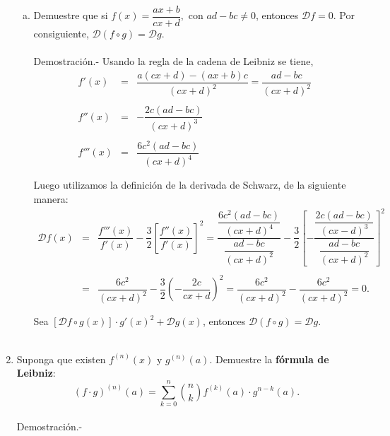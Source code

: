 \begin{enumerate}[\bfseries 1.]
\begin{enumerate}[(a)]
	     \item Demuestre que si $f(x)=\dfrac{ax+b}{cx+d},$ con $ad-bc\neq 0$, entonces $\mathscr{D}f=0.$ Por consiguiente, $\mathscr{D}(f\circ g)=\mathscr{D}g.$\\\\
		 Demostración.-\; Usando la regla de la cadena de Leibniz se tiene,
		 $$\begin{array}{rcl}
		     f'(x)&=&\dfrac{a(cx+d)-(ax+b)c}{(cx+d)^2} = \dfrac{ad-bc}{(cx+d)^2}\\\\
		     f''(x)&=&-\dfrac{2c(ad-bc)}{(cx+d)^3}\\\\
		     f'''(x)&=&\dfrac{6c^2(ad-bc)}{(cx+d)^4}\\\\
		 \end{array}$$
		 Luego utilizamos la definición de la derivada de Schwarz, de la siguiente manera:
		 $$\begin{array}{rcl}
		     \mathscr{D}f(x)&=&\dfrac{f'''(x)}{f'(x)}-\dfrac{3}{2}\left[\dfrac{f''(x)}{f'(x)}\right]^2=\dfrac{\dfrac{6c^2(ad-bc)}{(cx+d)^4}}{\dfrac{ad-bc}{(cx+d)^2}}-\dfrac{3}{2}\left[-\dfrac{\dfrac{2c(ad-bc)}{(cx-d)^3}}{\dfrac{ad-bc}{(cx+d)^2}}\right]^2\\\\
				    &=&\dfrac{6c^2}{(cx+d)^2}-\dfrac{3}{2}\left(-\dfrac{2c}{cx+d}\right)^2=\dfrac{6c^2}{(cx+d)^2}-\dfrac{6c^2}{(cx+d)^2}=0.\\\\
		 \end{array}$$
		 Sea $\left[\mathscr{D}f\circ g(x)\right]\cdot g'(x)^2+\mathscr{D}g(x)$, entonces $\mathscr{D}(f\circ g)=\mathscr{D}g.$\\\\

	 \end{enumerate}

     \item Suponga que existen $f^{(n)}(x)$ y $g^{(n)}(a)$. Demuestre la \textbf{fórmula de Leibniz}:
	 $$(f\cdot g)^{(n)}(a)=\sum_{k=0}^n {n\choose k}f^{(k)}(a)\cdot g^{n-k}(a).$$\\
	 Demostración.-\; 
    

\end{enumerate}
